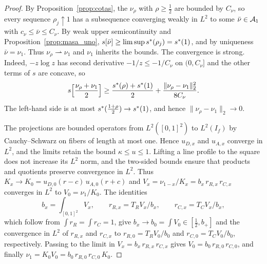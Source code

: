 \begin{proof} By Proposition~\ref{prop:cotas}, the $\nu_\rho$ with $\rho\ge\frac12$ are bounded by $C_\nu$, so every sequence
$\rho_j\uparrow1$ has a subsequence converging weakly in $L^2$ to some $\bar\nu\in{\mathcal{A}}_1$ with $c_\nu\le\bar\nu\le C_\nu$. By weak upper
semicontinuity and Proposition~\ref{prop:masa_uno}, $s[\bar\nu]\ge\limsup s^{*}(\rho_j)=s^{*}(1)$, and by uniqueness $\bar\nu=\nu_1$.
Thus $\nu_\rho\rightharpoonup\nu_1$ and $\nu_1$ inherits the bounds. The convergence is strong. Indeed, $-z\log z$ has second
derivative $-1/z\le-1/C_\nu$ on $(0,C_\nu]$ and the other terms of $s$ are concave, so \[
 s\Bigl[\frac{\nu_\rho+\nu_1}2\Bigr]\ge\frac{s^{*}(\rho)+s^{*}(1)}2+\frac{\|\nu_\rho-\nu_1\|_2^2}{8C_\nu}.
\] The left-hand side is at most $s^{*}(\frac{1+\rho}2)\to s^{*}(1)$, and hence $\|\nu_\rho-\nu_1\|_2\to0$.

The projections are bounded operators from $L^2([0,1]^2)$ to $L^2(I_f)$ by Cauchy--Schwarz on fibers of length at most one. Hence
$u_{D,x}$ and $u_{A,x}$ converge in $L^2$, and the limits retain the bound $\kappa\le u\le1$. Lifting a line profile to the square does
not increase its $L^2$ norm, and the two-sided bounds ensure that products and quotients preserve convergence in $L^2$. Thus $K_x\to
K_0=u_{D,0}(r-c)\,u_{A,0}(r+c)$ and $V_x=\nu_{1-x}/K_x=b_x\,r_{R,x}\,r_{C,x}$ converges in $L^2$ to $V_0=\nu_1/K_0$. The identities
\begin{equation}\label{eq:identidades_V}
 b_x=\int_{[0,1]^2}V_x,\qquad r_{R,x}=T_RV_x/b_x,\qquad r_{C,x}=T_CV_x/b_x,
\end{equation} which follow from $\int r_R=\int r_C=1$, give $b_x\to b_0=\int V_0\in[\frac12,b_+]$ and the convergence in $L^2$ of
$r_{R,x}$ and $r_{C,x}$ to $r_{R,0}=T_RV_0/b_0$ and $r_{C,0}=T_CV_0/b_0$, respectively. Passing to the limit in
$V_x=b_x\,r_{R,x}\,r_{C,x}$ gives $V_0=b_0\,r_{R,0}\,r_{C,0}$, and finally $\nu_1=K_0V_0=b_0\,r_{R,0}\,r_{C,0}\,K_0$. \end{proof}
